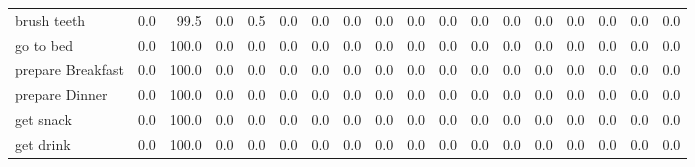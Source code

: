 \documentclass{article}
\begin{document}
\begin{sideways}
\begin{tabular}{lrrrrrrrrrrrrrrrrr}
brush teeth                   &         0.0 &               99.5 &           0.0 &               0.5 &                0.0 &                0.0 &              0.0 &                      0.0 &                   0.0 &              0.0 &              0.0 &                            0.0 &                      0.0 &                    0.0 &                                  0.0 &                          0.0 &                  0.0 \\
go to bed                     &         0.0 &              100.0 &           0.0 &               0.0 &                0.0 &                0.0 &              0.0 &                      0.0 &                   0.0 &              0.0 &              0.0 &                            0.0 &                      0.0 &                    0.0 &                                  0.0 &                          0.0 &                  0.0 \\
prepare Breakfast             &         0.0 &              100.0 &           0.0 &               0.0 &                0.0 &                0.0 &              0.0 &                      0.0 &                   0.0 &              0.0 &              0.0 &                            0.0 &                      0.0 &                    0.0 &                                  0.0 &                          0.0 &                  0.0 \\
prepare Dinner                &         0.0 &              100.0 &           0.0 &               0.0 &                0.0 &                0.0 &              0.0 &                      0.0 &                   0.0 &              0.0 &              0.0 &                            0.0 &                      0.0 &                    0.0 &                                  0.0 &                          0.0 &                  0.0 \\
get snack                     &         0.0 &              100.0 &           0.0 &               0.0 &                0.0 &                0.0 &              0.0 &                      0.0 &                   0.0 &              0.0 &              0.0 &                            0.0 &                      0.0 &                    0.0 &                                  0.0 &                          0.0 &                  0.0 \\
get drink                     &         0.0 &              100.0 &           0.0 &               0.0 &                0.0 &                0.0 &              0.0 &                      0.0 &                   0.0 &              0.0 &              0.0 &                            0.0 &                      0.0 &                    0.0 &                                  0.0 &                          0.0 &                  0.0 \\

\end{tabular}
\end{sideways}
\end{document}
